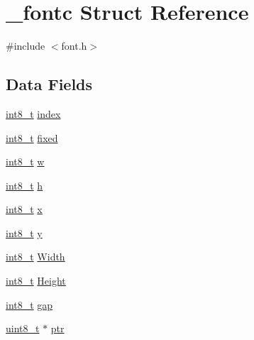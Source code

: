 \hypertarget{struct__fontc}{\section{\-\_\-fontc Struct Reference}
\label{struct__fontc}
}


{\ttfamily \#include $<$font.\-h$>$}

\subsection*{Data Fields}
\begin{DoxyCompactItemize}
\item 
\hyperlink{earth2wireframe_8c_aef44329758059c91c76d334e8fc09700}{int8\-\_\-t} \hyperlink{struct__fontc_a7cc0370744ff7ea964054d36917c9a2f}{index}
\item 
\hyperlink{earth2wireframe_8c_aef44329758059c91c76d334e8fc09700}{int8\-\_\-t} \hyperlink{struct__fontc_aec700f6ada95d1bced81fc2728633878}{fixed}
\item 
\hyperlink{earth2wireframe_8c_aef44329758059c91c76d334e8fc09700}{int8\-\_\-t} \hyperlink{struct__fontc_a9c2af0354d2b2009e7b6684e25fd479b}{w}
\item 
\hyperlink{earth2wireframe_8c_aef44329758059c91c76d334e8fc09700}{int8\-\_\-t} \hyperlink{struct__fontc_a9feb8c838dfc1d4eebb15c8e53981944}{h}
\item 
\hyperlink{earth2wireframe_8c_aef44329758059c91c76d334e8fc09700}{int8\-\_\-t} \hyperlink{struct__fontc_ad15d00ed46ebe52a085cf05b5ca5da90}{x}
\item 
\hyperlink{earth2wireframe_8c_aef44329758059c91c76d334e8fc09700}{int8\-\_\-t} \hyperlink{struct__fontc_aebbde0dc41068722ee1a69f4a56478a4}{y}
\item 
\hyperlink{earth2wireframe_8c_aef44329758059c91c76d334e8fc09700}{int8\-\_\-t} \hyperlink{struct__fontc_ae3c802e1c35ae9a4e37c8eb2e9644325}{Width}
\item 
\hyperlink{earth2wireframe_8c_aef44329758059c91c76d334e8fc09700}{int8\-\_\-t} \hyperlink{struct__fontc_a98f97c237dfb1027c38813a17ef6dcd6}{Height}
\item 
\hyperlink{earth2wireframe_8c_aef44329758059c91c76d334e8fc09700}{int8\-\_\-t} \hyperlink{struct__fontc_a38c23e7e200346fce3777d4efa30488f}{gap}
\item 
\hyperlink{send_8c_aba7bc1797add20fe3efdf37ced1182c5}{uint8\-\_\-t} $\ast$ \hyperlink{struct__fontc_a60a3fef5ccd80dff543aac3f22f74876}{ptr}
\end{DoxyCompactItemize}


